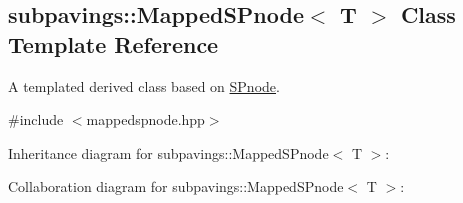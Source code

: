\hypertarget{classsubpavings_1_1MappedSPnode}{\subsection{subpavings\-:\-:\-Mapped\-S\-Pnode$<$ \-T $>$ \-Class \-Template \-Reference}
\label{classsubpavings_1_1MappedSPnode}
}


\-A templated derived class based on \hyperlink{classsubpavings_1_1SPnode}{\-S\-Pnode}.  




{\ttfamily \#include $<$mappedspnode.\-hpp$>$}



\-Inheritance diagram for subpavings\-:\-:\-Mapped\-S\-Pnode$<$ \-T $>$\-:


\-Collaboration diagram for subpavings\-:\-:\-Mapped\-S\-Pnode$<$ \-T $>$\-:
